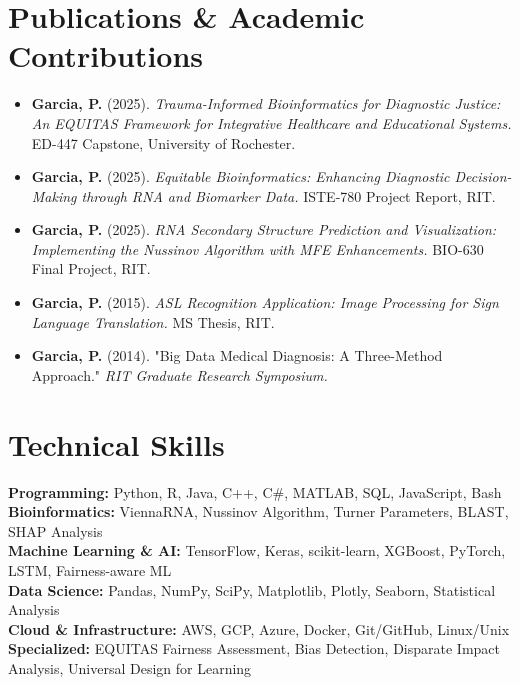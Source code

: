 \documentclass[10pt]{article}
\begin{document}
\section{Publications \& Academic Contributions}

\begin{itemize}[leftmargin=*]
\item \textbf{Garcia, P.} (2025). \textit{Trauma-Informed Bioinformatics for Diagnostic Justice: An EQUITAS Framework for Integrative Healthcare and Educational Systems.} ED-447 Capstone, University of Rochester.

\item \textbf{Garcia, P.} (2025). \textit{Equitable Bioinformatics: Enhancing Diagnostic Decision-Making through RNA and Biomarker Data.} ISTE-780 Project Report, RIT.

\item \textbf{Garcia, P.} (2025). \textit{RNA Secondary Structure Prediction and Visualization: Implementing the Nussinov Algorithm with MFE Enhancements.} BIO-630 Final Project, RIT.

\item \textbf{Garcia, P.} (2015). \textit{ASL Recognition Application: Image Processing for Sign Language Translation.} MS Thesis, RIT.

\item \textbf{Garcia, P.} (2014). "Big Data Medical Diagnosis: A Three-Method Approach." \textit{RIT Graduate Research Symposium.}
\end{itemize}


\section{Technical Skills}

\textbf{Programming:} Python, R, Java, C++, C\#, MATLAB, SQL, JavaScript, Bash \\
\textbf{Bioinformatics:} ViennaRNA, Nussinov Algorithm, Turner Parameters, BLAST, SHAP Analysis \\
\textbf{Machine Learning \& AI:} TensorFlow, Keras, scikit-learn, XGBoost, PyTorch, LSTM, Fairness-aware ML \\
\textbf{Data Science:} Pandas, NumPy, SciPy, Matplotlib, Plotly, Seaborn, Statistical Analysis \\
\textbf{Cloud \& Infrastructure:} AWS, GCP, Azure, Docker, Git/GitHub, Linux/Unix \\
\textbf{Specialized:} EQUITAS Fairness Assessment, Bias Detection, Disparate Impact Analysis, Universal Design for Learning
\end{document}
